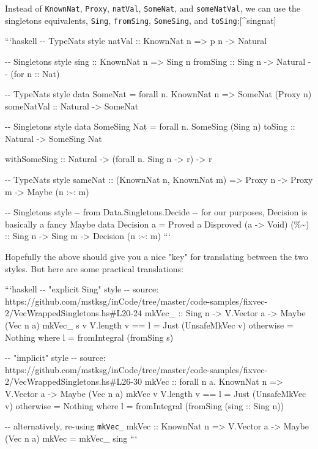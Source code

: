 \documentclass[]{article}
\begin{document}
Instead of \texttt{KnownNat}, \texttt{Proxy}, \texttt{natVal}, \texttt{SomeNat},
and \texttt{someNatVal}, we can use the singletons equivalents, \texttt{Sing},
\texttt{fromSing}, \texttt{SomeSing}, and \texttt{toSing}:{[}\^{}singnat{]}

```haskell -\/- TypeNats style natVal :: KnownNat n =\textgreater{} p n
-\textgreater{} Natural

-\/- Singletons style sing :: KnownNat n =\textgreater{} Sing n fromSing :: Sing
n -\textgreater{} Natural -\/- (for n :: Nat)

-\/- TypeNats style data SomeNat = forall n. KnownNat n =\textgreater{} SomeNat
(Proxy n) someNatVal :: Natural -\textgreater{} SomeNat

-\/- Singletons style data SomeSing Nat = forall n. SomeSing (Sing n) toSing ::
Natural -\textgreater{} SomeSing Nat

withSomeSing :: Natural -\textgreater{} (forall n. Sing n -\textgreater{} r)
-\textgreater{} r

-\/- TypeNats style sameNat :: (KnownNat n, KnownNat m) =\textgreater{} Proxy n
-\textgreater{} Proxy m -\textgreater{} Maybe (n :\textasciitilde{}: m)

-\/- Singletons style -\/- from Data.Singletons.Decide -\/- for our purposes,
Decision is basically a fancy Maybe data Decision a = Proved a \textbar{}
Disproved (a -\textgreater{} Void) (\%\textasciitilde{}) :: Sing n
-\textgreater{} Sing m -\textgreater{} Decision (n :\textasciitilde{}: m) ```

Hopefully the above should give you a nice "key" for translating between the two
styles. But here are some practical translations:

```haskell -\/- "explicit Sing" style -\/- source:
https://github.com/mstksg/inCode/tree/master/code-samples/fixvec-2/VecWrappedSingletons.hs\#L20-24
mkVec\_ :: Sing n -\textgreater{} V.Vector a -\textgreater{} Maybe (Vec n a)
mkVec\_ s v \textbar{} V.length v == l = Just (UnsafeMkVec v) \textbar{}
otherwise = Nothing where l = fromIntegral (fromSing s)

-\/- "implicit" style -\/- source:
https://github.com/mstksg/inCode/tree/master/code-samples/fixvec-2/VecWrappedSingletons.hs\#L26-30
mkVec :: forall n a. KnownNat n =\textgreater{} V.Vector a -\textgreater{} Maybe
(Vec n a) mkVec v \textbar{} V.length v == l = Just (UnsafeMkVec v) \textbar{}
otherwise = Nothing where l = fromIntegral (fromSing (sing :: Sing n))

-\/- alternatively, re-using \texttt{mkVec\_} mkVec :: KnownNat n
=\textgreater{} V.Vector a -\textgreater{} Maybe (Vec n a) mkVec = mkVec\_ sing
```
\end{document}
